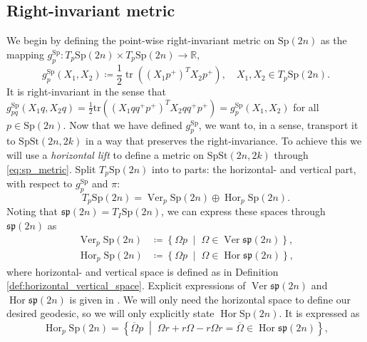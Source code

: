\subsection{Right-invariant metric}
We begin by defining the point-wise right-invariant metric on $\mathrm{Sp}(2n)$ as the mapping $g_{p}^{\mathrm{Sp}}\colon T_{p}\mathrm{Sp}(2n)\times T_{p}\mathrm{Sp}(2n)\xrightarrow{}\mathbb{R}$, 
\begin{equation}\label{eq:sp_metric}
    g_{p}^{\mathrm{Sp}}(X_{1},X_{2})\coloneqq\frac{1}{2}\operatorname{tr}((X_{1}p^{+})^{T}X_{2}p^{+}),\quad X_{1},X_{2}\in T_{p}\mathrm{Sp}(2n).
\end{equation}
It is right-invariant in the sense that
$g_{pq}^{\mathrm{Sp}}(X_{1}q,X_{2}q)=\tfrac{1}{2}\mathrm{tr}((X_{1}qq^{+}p^{+})^{T}X_{2}qq^{+}p^{+})=g_{p}^{\mathrm{Sp}}(X_{1},X_{2})$ for all $p\in \mathrm{Sp}(2n)$.
Now that we have defined $g_{p}^{\mathrm{Sp}}$, we want to, in a sense, transport it to $\mathrm{SpSt}(2n, 2k)$ in a way that preserves the right-invariance. To achieve this we will use a \textit{horizontal lift} to define a metric on $\mathrm{SpSt}(2n, 2k)$ through \ref{eq:sp_metric}. Split $T_{p}\mathrm{Sp}(2n)$ into to parts: the horizontal- and vertical part, with respect to $g^\mathrm{Sp}_{p}$ and $\pi$: %
\begin{equation}\label{eq:spst_split}
    T_{p}\mathrm{Sp}(2n)=\operatorname{Ver}_{p}\mathrm{Sp}(2n)\oplus \operatorname{Hor}_{p}\mathrm{Sp}(2n).
\end{equation}
%
%
%
Noting that $\mathfrak{sp}(2n)=T_{I}\mathrm{Sp}(2n)$, we can express these spaces through $\mathfrak{sp}(2n)$ as
%
\begin{align*}
\operatorname{Ver}_{p}\mathrm{Sp}(2n)&\coloneqq\left\{ \Omega p\;\middle|\;\Omega \in \operatorname{Ver}\mathfrak{sp}(2n) \right\}, \\
\operatorname{Hor}_{p}\mathrm{Sp}(2n)&\coloneqq\left\{ \Omega p\;\middle|\;\Omega \in \operatorname{Hor}\mathfrak{sp}(2n) \right\},
\end{align*}
%
where horizontal- and vertical space is defined as in Definition \ref{def:horizontal_vertical_space}. Explicit expressions of $\operatorname{Ver}\mathfrak{sp}(2n)$ and $\operatorname{Hor}\mathfrak{sp}(2n)$ is given in \cite[p.~11]{BendokatZimmermann2021}. We will only need the horizontal space to define our desired geodesic, so we will only explicitly state $\operatorname{Hor}\mathrm{Sp}(2n)$. It is expressed as
%
\begin{equation*}
\operatorname{Hor}_{p}\mathrm{Sp}(2n)=\left\{ \overline{\Omega}p\;\middle|\;\Omega r+r\Omega-r\Omega r=\overline{\Omega}\in \operatorname{Hor}\mathfrak{sp}(2n) \right\},
\end{equation*}
